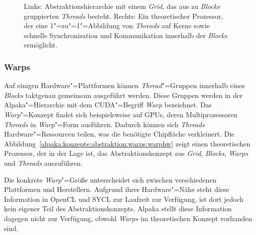 \begin{figure}
\begin{tikzpicture}
    \end{tikzpicture}
    \caption{Links: Abstraktionshierarchie mit einem \textit{Grid}, das aus
             zu \textit{Blocks} gruppierten \textit{Threads} besteht.
             Rechts: Ein theoretischer Prozessor, der eine 1"=zu"=1"=Abbildung
             von \textit{Threads} auf Kerne sowie schnelle Synchronisation und
             Kommunikation innerhalb der \textit{Blocks} ermöglicht.
             \cite[nach][19]{worpitz2015}}
    \label{alpaka:konzepte:abstraktion:blocks:gridblockhw}
\end{figure}

\subsubsection{Warps}

Auf einigen Hardware"=Plattformen können \textit{Thread}"=Gruppen innerhalb
eines \textit{Blocks} taktgenau gemeinsam ausgeführt werden. Diese Gruppen
werden in der Alpaka"=Hierarchie mit dem CUDA"=Begriff \textit{Warp} bezeichnet.
Das \textit{Warp}"=Konzept findet sich beispielsweise auf GPUs, deren
Multiprozessoren \textit{Threads} in \textit{Warp}"=Form ausführen. Dadurch
können sich \textit{Threads} Hardware"=Ressourcen teilen, was die benötigte
Chipfläche verkleinert. Die
Abbildung~\ref{alpaka:konzepte:abstraktion:warps:warphw} zeigt einen
theoretischen Prozessor, der in der Lage ist, das Abstraktionskonzept aus
\textit{Grid}, \textit{Blocks}, \textit{Warps} und \textit{Threads} auszuführen.

Die konkrete \textit{Warp}"=Größe unterscheidet sich zwischen verschiedenen
Plattformen und Herstellern. Aufgrund ihrer Hardware"=Nähe steht diese
Information in OpenCL und SYCL zur Laufzeit zur Verfügung, ist dort jedoch kein
eigener Teil des Abstraktionskonzepts. Alpaka stellt diese Information dagegen
nicht zur Verfügung, obwohl \textit{Warps} im theoretischen Konzept vorhanden
sind.

